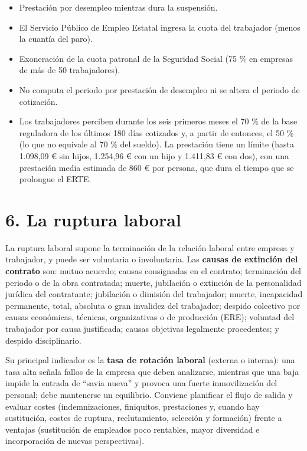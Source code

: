 \documentclass[12pt]{book} %
\providecommand{\tightlist}{%
  \setlength{\itemsep}{0pt}\setlength{\parskip}{0pt}}
\begin{document}
\begin{itemize}
\tightlist
\item
  Prestación por desempleo mientras dura la suspensión.
\item
  El Servicio Público de Empleo Estatal ingresa la cuota del trabajador
  (menos la cuantía del paro).
\item
  Exoneración de la cuota patronal de la Seguridad Social (75 \% en
  empresas de más de 50 trabajadores).
\item
  No computa el periodo por prestación de desempleo ni se altera el
  periodo de cotización.
\item
  Los trabajadores perciben durante los seis primeros meses el 70 \% de
  la base reguladora de los últimos 180 días cotizados y, a partir de
  entonces, el 50 \% (lo que no equivale al 70 \% del sueldo). La
  prestación tiene un límite (hasta 1.098,09 € sin hijos, 1.254,96 € con
  un hijo y 1.411,83 € con dos), con una prestación media estimada de
  860 € por persona, que dura el tiempo que se prolongue el ERTE.
\end{itemize}

\hypertarget{la-ruptura-laboral}{%
\section{6. La ruptura laboral}\label{la-ruptura-laboral}}

La ruptura laboral supone la terminación de la relación laboral entre
empresa y trabajador, y puede ser voluntaria o involuntaria. Las
\textbf{causas de extinción del contrato} son: mutuo acuerdo; causas
consignadas en el contrato; terminación del periodo o de la obra
contratada; muerte, jubilación o extinción de la personalidad jurídica
del contratante; jubilación o dimisión del trabajador; muerte,
incapacidad permanente, total, absoluta o gran invalidez del trabajador;
despido colectivo por causas económicas, técnicas, organizativas o de
producción (ERE); voluntad del trabajador por causa justificada; causas
objetivas legalmente procedentes; y despido disciplinario.

Su principal indicador es la \textbf{tasa de rotación laboral} (externa
o interna): una tasa alta señala fallos de la empresa que deben
analizarse, mientras que una baja impide la entrada de ``savia nueva'' y
provoca una fuerte inmovilización del personal; debe mantenerse un
equilibrio. Conviene planificar el flujo de salida y evaluar costes
(indemnizaciones, finiquitos, prestaciones y, cuando hay sustitución,
costes de ruptura, reclutamiento, selección y formación) frente a
ventajas (sustitución de empleados poco rentables, mayor diversidad e
incorporación de nuevas perspectivas).
\end{document}
